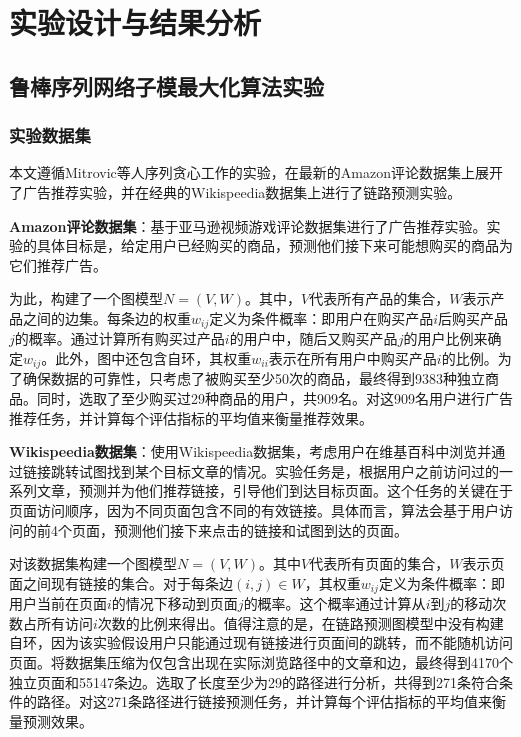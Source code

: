\chapter{实验设计与结果分析}


\section{鲁棒序列网络子模最大化算法实验}
\label{sec:5_1}

\subsection{实验数据集}

本文遵循Mitrovic\cite{mitrovic2018submodularity}等人序列贪心工作的实验，在最新的Amazon评论数据集上展开了广告推荐实验，并在经典的Wikispeedia数据集上进行了链路预测实验。

{\bfseries Amazon评论数据集}：基于亚马逊视频游戏评论数据集\cite{ni2019justifying}进行了广告推荐实验。实验的具体目标是，给定用户已经购买的商品，预测他们接下来可能想购买的商品为它们推荐广告。

为此，构建了一个图模型$N = (V,W)$。其中，$V$代表所有产品的集合，$W$表示产品之间的边集。每条边的权重$w_{ij}$定义为条件概率：即用户在购买产品$i$后购买产品$j$的概率。通过计算所有购买过产品$i$的用户中，随后又购买产品$j$的用户比例来确定$w_{ij}$。此外，图中还包含自环，其权重$w_{ii}$表示在所有用户中购买产品$i$的比例。为了确保数据的可靠性，只考虑了被购买至少50次的商品，最终得到9383种独立商品。同时，选取了至少购买过29种商品的用户，共909名。对这909名用户进行广告推荐任务，并计算每个评估指标的平均值来衡量推荐效果。

{\bfseries Wikispeedia数据集}：使用Wikispeedia数据集\cite{west2009wikispeedia}，考虑用户在维基百科中浏览并通过链接跳转试图找到某个目标文章的情况。实验任务是，根据用户之前访问过的一系列文章，预测并为他们推荐链接，引导他们到达目标页面。这个任务的关键在于页面访问顺序，因为不同页面包含不同的有效链接。具体而言，算法会基于用户访问的前4个页面，预测他们接下来点击的链接和试图到达的页面。

对该数据集构建一个图模型$N = (V,W)$。其中$V$代表所有页面的集合，$W$表示页面之间现有链接的集合。对于每条边$(i,j)\in W$，其权重$w_{ij}$定义为条件概率：即用户当前在页面$i$的情况下移动到页面$j$的概率。这个概率通过计算从$i$到$j$的移动次数占所有访问$i$次数的比例来得出。值得注意的是，在链路预测图模型中没有构建自环，因为该实验假设用户只能通过现有链接进行页面间的跳转，而不能随机访问页面。将数据集压缩为仅包含出现在实际浏览路径中的文章和边，最终得到4170个独立页面和55147条边。选取了长度至少为29的路径进行分析，共得到271条符合条件的路径。对这271条路径进行链接预测任务，并计算每个评估指标的平均值来衡量预测效果。




